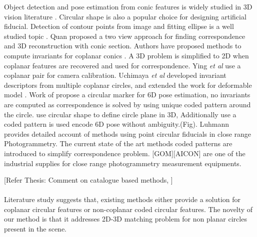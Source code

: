 \documentclass{bmvc2k}
\def\etal{\emph{et al}\bmvaOneDot}
\begin{document}
Object detection and pose estimation from conic features is widely studied in 3D vision literature  \cite{dhome_spatial_1990}\cite{safaee-rad_three-dimensional_1992} \cite{werghi_pose_1996} \cite{quan_invariant_1995}. Circular shape is also a popular choice for designing artificial fiducial. Detection of contour points from image and fitting ellipse is a well studied topic \cite{fitzgibbon_direct_1999}. 
Quan \cite{quan_conic_1996} proposed a two view approach for finding correspondence and 3D reconstruction with conic section. Authors have proposed methods to compute invariants for coplanar conics \cite{forsyth_91} \cite{Ferri_1993}.  
A 3D problem is simplified to 2D when coplanar features are recovered and used for correspondence.  
Ying \etal \cite{ying_camera_2007} use a coplanar pair for camera calibration. 
Uchimaya \etal \cite{uchiyama_random_2011} developed invariant descriptors from multiple coplanar circles, and extended the work for deformable model \cite{uchiyama_deformable_2011}.
Work of \cite{lo_pez_de_ipin_a_trip:_2002} \cite{naimark_circular_2002} \cite{pagani_circular_2011} propose a circular marker for 6D pose estimation, no invariants are computed as correspondence is solved by using unique coded pattern around the circle. 
\cite{lo_pez_de_ipin_a_trip:_2002}\cite{pagani_circular_2011} use circular shape to define circle plane in 3D, Additionally use a coded pattern is used encode 6D pose without ambiguity.(Fig). 
Luhmann \cite{luhmann_close_2006} provides detailed account of methods using point circular fiducials in close range Photogrammetry. The current state of the art methods coded patterns are introduced to simplify correspondence problem.
[GOM][AICON] are one of the industrial supplies for close range photogrammetry measurement equipments. 

[Refer Thesis: Comment on catalogue based methods, ]
\paragraph{}
Literature study suggests that, existing methods either provide a solution for coplanar circular features or non-coplanar  coded circular features. The novelty of our method is that it addresses 2D-3D matching problem for non planar circles present in the scene. 
\end{document}
